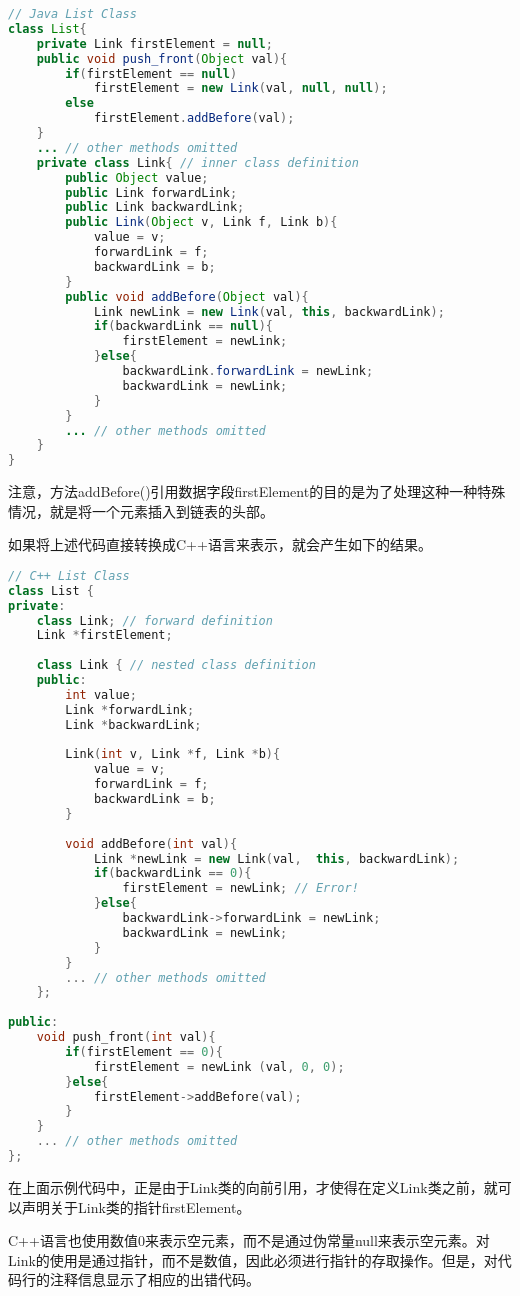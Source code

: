 \begin{lstlisting}[language=Java]
// Java List Class
class List{
	private Link firstElement = null;
	public void push_front(Object val){
		if(firstElement == null)
			firstElement = new Link(val, null, null);
		else
			firstElement.addBefore(val);
	}
	... // other methods omitted 
	private class Link{ // inner class definition
		public Object value;
		public Link forwardLink;
		public Link backwardLink;
		public Link(Object v, Link f, Link b){
			value = v;
			forwardLink = f;
			backwardLink = b;
		}
		public void addBefore(Object val){
			Link newLink = new Link(val, this, backwardLink);
			if(backwardLink == null){
				firstElement = newLink;
			}else{
				backwardLink.forwardLink = newLink;
				backwardLink = newLink;
			}
		}
		... // other methods omitted
	}
}
\end{lstlisting}

注意，方法addBefore()引用数据字段firstElement的目的是为了处理这种一种特殊情况，就是将一个元素插入到链表的头部。

如果将上述代码直接转换成C++语言来表示，就会产生如下的结果。


\begin{lstlisting}[language=C++]
// C++ List Class
class List {
private:
	class Link; // forward definition
	Link *firstElement;
	
	class Link { // nested class definition
	public:
		int value;
		Link *forwardLink;
		Link *backwardLink;
		
		Link(int v, Link *f, Link *b){
			value = v;
			forwardLink = f;
			backwardLink = b;
		}
		
		void addBefore(int val){
			Link *newLink = new Link(val,  this, backwardLink);
			if(backwardLink == 0){
				firstElement = newLink; // Error!
			}else{
				backwardLink->forwardLink = newLink;
				backwardLink = newLink;
			}
		}
		... // other methods omitted
	};
	
public:
	void push_front(int val){
		if(firstElement == 0){
			firstElement = newLink (val, 0, 0);
		}else{
			firstElement->addBefore(val);
		}
	}
	... // other methods omitted
};
\end{lstlisting}


在上面示例代码中，正是由于Link类的向前引用，才使得在定义Link类之前，就可以声明关于Link类的指针firstElement。

C++语言也使用数值0来表示空元素，而不是通过伪常量null来表示空元素。对Link的使用是通过指针，而不是数值，因此必须进行指针的存取操作。但是，对代码行的注释信息显示了相应的出错代码。

